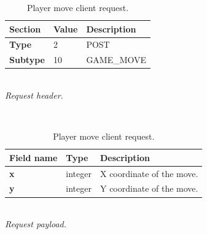 \documentclass[english, sem, kiv, he, iso690alph, pdf, viewonly]{fasthesis}
\begin{document}
\begin{table}[h!]
	\centering
	\begin{minipage}[b]{1.0\textwidth}
		\centering
		\begin{tabular}{|l|l|l|}
			\hline
			\textbf{Section} & \textbf{Value} & \textbf{Description} \\ \hline
			\textbf{Type} & 2 & \footnotesize{POST} \\ \hline
			\textbf{Subtype} & 10 & \footnotesize{GAME\_MOVE}  \\ \hline
		\end{tabular} \\
		\textit{Request header.}
	\end{minipage} 
	\\
	\vspace{10pt}
	\begin{minipage}[b]{1.0\textwidth}
		\centering
		\begin{tabular}{|l|l|l|}
			\hline
			\textbf{Field name} & \textbf{Type} & \textbf{Description} \\ \hline
			\textbf{x} & integer & X coordinate of the move. \\ \hline
            \textbf{y} & integer & Y coordinate of the move. \\ \hline
		\end{tabular} \\
		\textit{Request payload.}
	\end{minipage}	
	\caption{Player move client request.}
	\label{tab:player_move_request}
\end{table}
\end{document}
